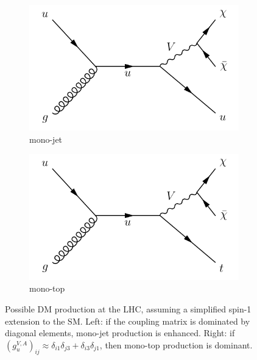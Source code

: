 \begin{figure}
    \begin{center}
        \begin{subfigure}[t]{0.49\textwidth}
            \includegraphics[width=\textwidth]{figures/monotop/diagrams/mj.pdf}
            \caption{mono-jet}
            \label{fig:fcncdiaga}
        \end{subfigure}
        \begin{subfigure}[t]{0.49\textwidth}
            \includegraphics[width=\textwidth]{figures/monotop/diagrams/fcncb.pdf}
            \caption{mono-top}
            \label{fig:fcncdiagb}
        \end{subfigure}
        \caption{Possible DM production at the LHC, assuming a simplified spin-1 extension to the SM. Left: if the coupling matrix is dominated by diagonal elements, mono-jet production is enhanced. Right: if $(g_{u}^{V,A})_{ij} \approx \delta_{i1}\delta_{j3} + \delta_{i3}\delta_{j1}$, then mono-top production is dominant.}
        \label{fig:fcncdiag}
    \end{center}
\end{figure}
    

